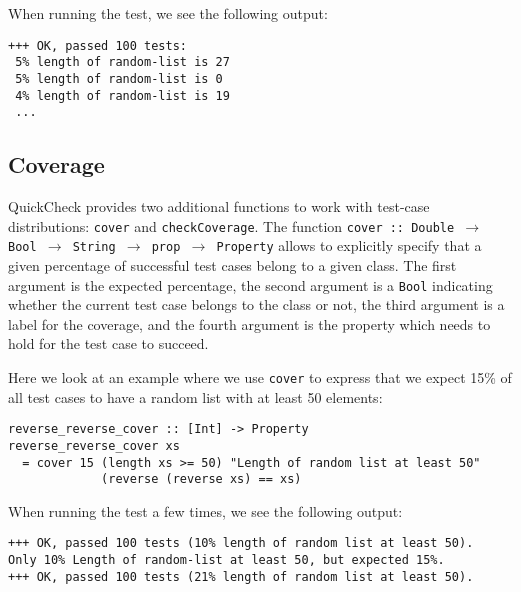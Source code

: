 When running the test, we see the following output:

\begin{footnotesize}
\begin{verbatim}
+++ OK, passed 100 tests:
 5% length of random-list is 27
 5% length of random-list is 0
 4% length of random-list is 19
 ...
\end{verbatim}
\end{footnotesize}

\subsection{Coverage}
QuickCheck provides two additional functions to work with test-case distributions: \texttt{cover} and \texttt{checkCoverage}. The function \texttt{cover :: Double $\rightarrow$ Bool $\rightarrow$ String $\rightarrow$ prop $\rightarrow$ Property} allows to explicitly specify that a given percentage of successful test cases belong to a given class. The first argument is the expected percentage, the second argument is a \texttt{Bool} indicating whether the current test case belongs to the class or not, the third argument is a label for the coverage, and the fourth argument is the property which needs to hold for the test case to succeed. 

Here we look at an example where we use \texttt{cover} to express that we expect 15\% of all test cases to have a random list with at least 50 elements:

\begin{footnotesize}
\begin{verbatim}
reverse_reverse_cover :: [Int] -> Property
reverse_reverse_cover xs  
  = cover 15 (length xs >= 50) "Length of random list at least 50"
             (reverse (reverse xs) == xs)
\end{verbatim}
\end{footnotesize}

When running the test a few times, we see the following output:

\begin{footnotesize}
\begin{verbatim}
+++ OK, passed 100 tests (10% length of random list at least 50).
Only 10% Length of random-list at least 50, but expected 15%.
+++ OK, passed 100 tests (21% length of random list at least 50).
\end{verbatim}
\end{footnotesize}

